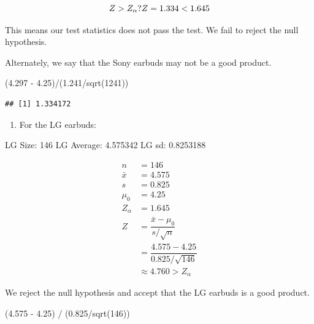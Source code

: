\documentclass[
]{article}
\newenvironment{Shaded}{\begin{snugshade}}{\end{snugshade}}
\newcommand{\DecValTok}[1]{\textcolor[rgb]{0.86,0.86,0.80}{#1}}
\newcommand{\FloatTok}[1]{\textcolor[rgb]{0.75,0.75,0.82}{#1}}
\newcommand{\FunctionTok}[1]{\textcolor[rgb]{0.94,0.94,0.56}{#1}}
\newcommand{\NormalTok}[1]{\textcolor[rgb]{0.80,0.80,0.80}{#1}}
\newcommand{\SpecialCharTok}[1]{\textcolor[rgb]{0.86,0.64,0.64}{#1}}
\providecommand{\tightlist}{%
  \setlength{\itemsep}{0pt}\setlength{\parskip}{0pt}}
\begin{document}
\[
Z > Z_{\alpha}?\\
Z = 1.334 < 1.645
\]

This means our test statistics does not pass the test. We fail to reject
the null hypothesis.

Alternately, we say that the Sony earbuds may not be a good product.

\begin{Shaded}
\begin{Highlighting}[]
\NormalTok{(}\FloatTok{4.297} \SpecialCharTok{{-}} \FloatTok{4.25}\NormalTok{)}\SpecialCharTok{/}\NormalTok{(}\FloatTok{1.241}\SpecialCharTok{/}\FunctionTok{sqrt}\NormalTok{(}\DecValTok{1241}\NormalTok{))}
\end{Highlighting}
\end{Shaded}

\begin{verbatim}
## [1] 1.334172
\end{verbatim}

\begin{enumerate}
\def\labelenumi{\alph{enumi})}
\setcounter{enumi}{1}
\tightlist
\item
  For the LG earbuds:
\end{enumerate}

LG Size: 146 LG Average: 4.575342 LG sd: 0.8253188

\[
\begin{aligned}
n &= 146\\
\bar{x} &= 4.575\\
s&= 0.825\\
\mu_0 &= 4.25\\
Z_\alpha &= 1.645\\
Z &= \dfrac{\bar{x} - \mu_0}{s/\sqrt{n}}\\
&= \dfrac{4.575 - 4.25}{0.825/\sqrt{146}}\\
&\approx 4.760 > Z_{\alpha}
\end{aligned}
\]

We reject the null hypothesis and accept that the LG earbuds is a good
product.

\begin{Shaded}
\begin{Highlighting}[]
\NormalTok{(}\FloatTok{4.575} \SpecialCharTok{{-}} \FloatTok{4.25}\NormalTok{) }\SpecialCharTok{/}\NormalTok{ (}\FloatTok{0.825}\SpecialCharTok{/}\FunctionTok{sqrt}\NormalTok{(}\DecValTok{146}\NormalTok{))}
\end{Highlighting}
\end{Shaded}
\end{document}
